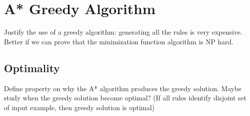 \section{A* Greedy Algorithm}
Justify the use of a greedy algorithm: generating all the rules is very expensive. Better if we can prove that the minimization function algorithm is NP hard.

\subsection{Optimality}
Define property on why the A* algorithm produces the greedy solution.
Maybe study when the greedy solution become optimal? (If all rules identify disjoint set of input example, then greedy solution is optimal)